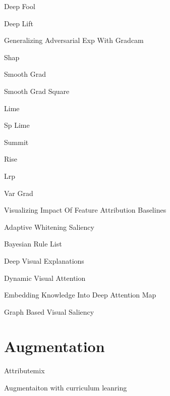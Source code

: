 Deep Fool

Deep Lift

Generalizing Adversarial Exp With Gradcam

Shap

Smooth Grad

Smooth Grad Square

Lime

Sp Lime

Summit

Rise

Lrp

Var Grad

Visualizing Impact Of Feature Attribution Baselines

Adaptive Whitening Saliency

Bayesian Rule List


Deep Visual Explanations

Dynamic Visual Attention

Embedding Knowledge Into Deep Attention Map

Graph Based Visual Saliency


\section{Augmentation}

Attributemix

Augmentaiton with curriculum leanring

